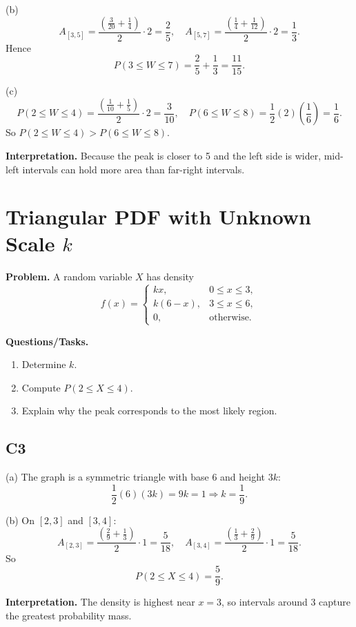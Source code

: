 (b)
\[
A_{[3,5]}=\frac{\left(\frac3{20}+\frac14\right)}{2}\cdot2=\frac25,
\quad
A_{[5,7]}=\frac{\left(\frac14+\frac1{12}\right)}{2}\cdot2=\frac13.
\]
Hence
\[
P(3\le W\le 7)=\frac25+\frac13=\frac{11}{15}.
\]

(c)
\[
P(2\le W\le 4)=\frac{\left(\frac1{10}+\frac15\right)}{2}\cdot2=\frac3{10},
\quad
P(6\le W\le 8)=\frac12(2)\left(\frac16\right)=\frac16.
\]
So $P(2\le W\le 4)>P(6\le W\le 8)$.

\textbf{Interpretation.}
Because the peak is closer to 5 and the left side is wider, mid-left intervals can hold more area than far-right intervals.

\section{Triangular PDF with Unknown Scale $k$}

\textbf{Problem.}
A random variable $X$ has density
\[
f(x)=\begin{cases}
kx, & 0\le x\le 3,\\
k(6-x), & 3\le x\le 6,\\
0, & \text{otherwise.}
\end{cases}
\]

\textbf{Questions/Tasks.}
\begin{enumerate}[label=(\alph*)]
\item Determine $k$.
\item Compute $P(2\le X\le 4)$.
\item Explain why the peak corresponds to the most likely region.
\end{enumerate}

\subsection*{C3}
(a) The graph is a symmetric triangle with base $6$ and height $3k$:
\[
\frac12(6)(3k)=9k=1\Rightarrow k=\frac19.
\]

(b) On $[2,3]$ and $[3,4]$:
\[
A_{[2,3]}=\frac{\left(\frac29+\frac13\right)}{2}\cdot1=\frac{5}{18},
\quad
A_{[3,4]}=\frac{\left(\frac13+\frac29\right)}{2}\cdot1=\frac{5}{18}.
\]
So
\[
P(2\le X\le 4)=\frac{5}{9}.
\]

\textbf{Interpretation.}
The density is highest near $x=3$, so intervals around $3$ capture the greatest probability mass.

